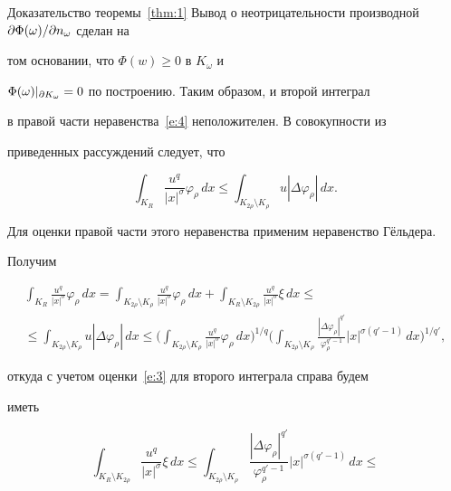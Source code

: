 \begin{pf*}{Доказательство теоремы~\ref{thm:1}}
Вывод о неотрицательности производной $\partial\Phi(\omega)/\partial n_\omega$ сделан на


том основании, что $\Phi(w)\ge0$ в $K_\omega$ и


$\Phi(\omega)|_{\partial K_\omega}=0$ по построению. Таким образом, и второй интеграл


в правой части неравенства~\eqref{e:4} неположителен. В совокупности из


приведенных рассуждений следует, что


$$


\int_{K_R}\frac{u^q}{|x|^\sigma}\varphi_\rho\,dx\le


\int_{K_{2\rho}\setminus K_\rho}u|\Delta\varphi_\rho|\,dx.


$$


Для оценки правой части этого неравенства применим неравенство Г\"ельдера.


Получим


\begin{multline}\label{e:5}


\int_{K_R}\frac{u^q}{|x|^\sigma}\varphi_\rho\,dx=


\int_{K_{2\rho}\setminus K_\rho}\frac{u^q}{|x|^\sigma}\varphi_\rho\,dx+


\int_{K_R\setminus K_{2\rho}}\frac{u^q}{|x|^\sigma}\xi\,dx \le \\ \le 


\int_{K_{2\rho}\setminus K_\rho}u|\Delta\varphi_\rho|\,dx\le


\Bigg(\int_{K_{2\rho}\setminus K_\rho}\frac{u^q}{|x|^\sigma}\varphi_\rho\,dx


\Bigg)^{1/q}


\Bigg(\int_{K_{2\rho}\setminus K_\rho}


\frac{|\Delta\varphi_\rho|^{q'}}{\varphi_\rho^{q'-1}}|x|^{\sigma(q'-1)}\,dx


\Bigg)^{1/q'},


\end{multline}


откуда с учетом оценки~\eqref{e:3} для второго интеграла справа будем


иметь


\begin{equation}\label{e:6}


\int_{K_R\setminus K_{2\rho}}\frac{u^q}{|x|^\sigma}\xi\,dx\le


\int_{K_{2\rho}\setminus K_\rho}


\frac{|\Delta\varphi_\rho|^{q'}}{\varphi_\rho^{q'-1}}|x|^{\sigma(q'-1)}\,dx\le



\end{equation}
\end{pf*}
